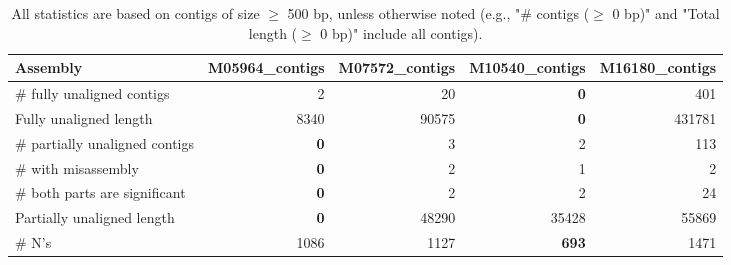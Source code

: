 \documentclass[12pt,a4paper]{article}
\begin{document}
\begin{table}[ht]
\begin{center}
\caption{All statistics are based on contigs of size $\geq$ 500 bp, unless otherwise noted (e.g., "\# contigs ($\geq$ 0 bp)" and "Total length ($\geq$ 0 bp)" include all contigs).}
\begin{tabular}{|l*{4}{|r}|}
\hline
Assembly & M05964\_contigs & M07572\_contigs & M10540\_contigs & M16180\_contigs \\ \hline
\# fully unaligned contigs & 2 & 20 & {\bf 0} & 401 \\ \hline
Fully unaligned length & 8340 & 90575 & {\bf 0} & 431781 \\ \hline
\# partially unaligned contigs & {\bf 0} & 3 & 2 & 113 \\ \hline
\hspace{5mm}\# with misassembly & {\bf 0} & 2 & 1 & 2 \\ \hline
\hspace{5mm}\# both parts are significant & {\bf 0} & 2 & 2 & 24 \\ \hline
Partially unaligned length & {\bf 0} & 48290 & 35428 & 55869 \\ \hline
\# N's & 1086 & 1127 & {\bf 693} & 1471 \\ \hline
\end{tabular}
\end{center}
\end{table}
\end{document}
